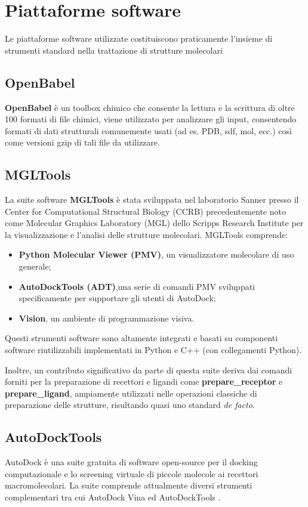 \section{Piattaforme software}
Le piattaforme software utilizzate costituiscono praticamente l'insieme di strumenti standard nella trattazione di strutture molecolari

\subsection{OpenBabel}
\textbf{OpenBabel} è un toolbox chimico che consente la lettura e la scrittura di oltre 100 formati di file chimici, viene utilizzato per analizzare gli input, consentendo formati di dati strutturali comunemente usati (ad es. PDB, sdf, mol, ecc.) così come versioni gzip di tali file da utilizzare.


\subsection{MGLTools} 
La suite software \textbf{MGLTools} è stata sviluppata nel laboratorio Sanner presso il Center for Computational Structural Biology (CCRB) precedentemente noto come Molecular Graphics Laboratory (MGL) dello Scripps Research Institute per la visualizzazione e l'analisi delle strutture molecolari. MGLTools comprende:
\begin{itemize}
    \item \textbf{Python Molecular Viewer (PMV)}, un visualizzatore molecolare di uso generale;
    \item \textbf{AutoDockTools (ADT)},una serie di comandi PMV sviluppati specificamente per supportare gli utenti di AutoDock;
    \item \textbf{Vision}, un ambiente di programmazione visiva.
\end{itemize}

Questi strumenti software sono altamente integrati e basati su componenti software riutilizzabili implementati in Python e C++ (con collegamenti Python).

Inoltre, un contributo significativo da parte di questa suite deriva dai comandi forniti per la preparazione di recettori e ligandi come \textbf{prepare\_receptor} e \textbf{prepare\_ligand}, ampiamente utilizzati nelle operazioni classiche di preparazione delle strutture, risultando quasi uno standard \textit{de facto}.

\subsection{AutoDockTools} \label{autodocktools}
AutoDock è una suite gratuita di software open-source  per il docking computazionale e lo screening virtuale di piccole molecole ai recettori macromolecolari. La suite comprende attualmente diversi strumenti complementari tra cui AutoDock Vina ed AutoDockTools \cite{forli_computational_2016}.

